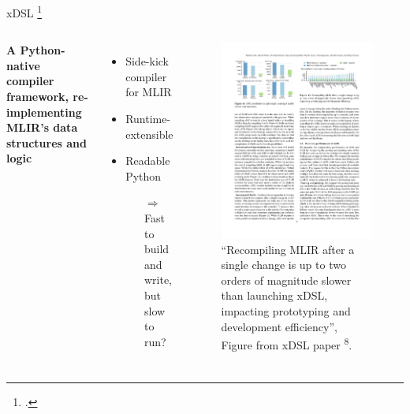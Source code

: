 \documentclass[10pt,aspectratio=169]{beamer}
\renewcommand{\cite}{\footcite}
\begin{document}
\begin{frame}{xDSL \cite{fehrXDSLSidekickCompilation2025}}
    \begin{columns}[T,onlytextwidth]
            \vspace{2em}
            {\large \textbf{A Python-native compiler framework, re-implementing MLIR’s data structures and logic}}
            \vspace{1.5em}
            \begin{itemize}
                \itemindent=-13pt
                \item Side-kick compiler for MLIR
                \item Runtime-extensible
                \item Readable Python
                \begin{itemize}
                    \itemindent=-13pt
                    \item[$\Rightarrow$] Fast to build and write, but slow to run?
                \end{itemize}
            \end{itemize}
            \begin{figure}[H]
                \includegraphics[width=\textwidth]{images/compile_times.pdf}
                \caption{``Recompiling MLIR after a single change is up
to two orders of magnitude slower than launching xDSL,
impacting prototyping and development efficiency'', Figure from xDSL paper \textsuperscript{8}.}
                \label{fig:compile_times}
            \end{figure}
    \end{columns}
\end{frame}
\end{document}
